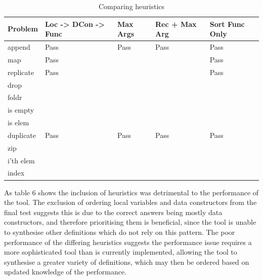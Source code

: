 \documentclass[a4paper]{article}
\begin{document}
\begin{table}[!htb]
  \begin{center}
\begin{tabular}{|l|l|l|l|l|}
\hline
Problem & Loc -> DCon -> Func & Max Args & Rec + Max Arg & Sort Func Only\\
\hline
append & Pass & Pass & Pass & Pass\\
map & Pass  & & & Pass\\
replicate & Pass & & & Pass\\
drop &   & & & \\
foldr &   & & & \\
is empty &   & & & \\
is elem &   &  & & \\
duplicate & Pass & Pass & Pass & Pass\\
zip &   & & & \\
i'th elem &  & & & \\ 
index &   &  & & \\
\hline
\end{tabular}
\caption{Comparing heuristics}
\end{center}
\end{table}

As table 6 shows the inclusion of heuristics was detrimental to the
performance of the tool. The exclusion of ordering local variables
and data constructors from the final test suggests this is due to
the correct answers being mostly data constructors, and therefore prioritising
them is beneficial, since the tool is unable to synthesise other definitions
which do not rely on this pattern. The poor performance of the differing
heuristics suggests the performance issue requires a more sophisticated tool
than is currently implemented, allowing the tool to synthesise a greater
variety of definitions, which may then be ordered based on updated knowledge of
the performance.

\clearpage
\end{document}
